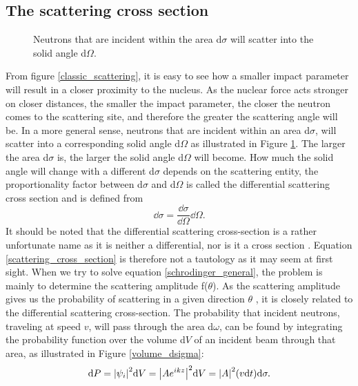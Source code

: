 \subsection{The scattering cross section}
\begin{figure}[b]
	\centering
	\def\svgwidth{\textwidth}
	
	\caption{Neutrons that are incident within the area d$\sigma$ will scatter into the solid angle d$\Omega$.}
	\label{scattering_cross_section_illustration}
\end{figure}
From figure \ref{classic_scattering}, it is easy to see how a smaller impact parameter will result in a closer proximity to the nucleus. As the nuclear force acts stronger on closer distances, the smaller the impact parameter, the closer the neutron comes to the scattering site, and therefore the greater the scattering angle will be. In a more general sense, neutrons that are incident within an area d$\sigma$, will scatter into a corresponding solid angle d$\Omega$ as illustrated in Figure \ref{scattering_cross_section_illustration}. The larger the area d$\sigma$ is, the larger the solid angle d$\Omega$ will become. How much the solid angle will change with a different d$\sigma$ depends on the scattering entity, the proportionality factor between d$\sigma$ and d$\Omega$ is called the differential scattering cross section and is defined from \cite{Griffiths_QM}
\begin{equation}\label{scattering_cross_section}
	\dd\sigma= \frac{\dd\sigma}{\dd\Omega} \dd\Omega.
\end{equation}
It should be noted that the differential scattering cross-section is a rather unfortunate name as it is neither a differential, nor is it a cross section \cite{Griffiths_QM}. Equation \ref{scattering_cross_section} is therefore not a tautology as it may seem at first sight. When we try to solve equation \ref{schrodinger_general}, the problem is mainly to determine the scattering amplitude f($\theta$). As the scattering amplitude gives us the probability of scattering in a given direction $\theta$ \cite{Griffiths_QM}, it is closely related to the differential scattering cross-section. The probability that incident neutrons, traveling at speed $v$, will pass through the area d$\omega$, can be found by integrating the probability function over the volume d$V$ of an incident beam through that area, as illustrated in Figure \ref{volume_dsigma}:
\begin{equation}\label{probability_dsigma}
	\dd P = \abs{\psi_i}^2 \dd V = \abs{Ae^{ikz}}^2 \dd V = \abs{A}^2 (v\dd t) \dd \sigma.
\end{equation}

